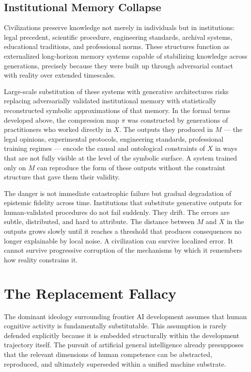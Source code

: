 \documentclass[12pt, a4paper]{article}
\theoremstyle{remark}
\begin{document}
\subsection{Institutional Memory Collapse}

Civilizations preserve knowledge not merely in individuals but in institutions: legal precedent, scientific procedure, engineering standards, archival systems, educational traditions, and professional norms. These structures function as externalized long-horizon memory systems capable of stabilizing knowledge across generations, precisely because they were built up through adversarial contact with reality over extended timescales.

Large-scale substitution of these systems with generative architectures risks replacing adversarially validated institutional memory with statistically reconstructed symbolic approximations of that memory. In the formal terms developed above, the compression map $\pi$ was constructed by generations of practitioners who worked directly in $X$. The outputs they produced in $M$ --- the legal opinions, experimental protocols, engineering standards, professional training regimes --- encode the causal and ontological constraints of $X$ in ways that are not fully visible at the level of the symbolic surface. A system trained only on $M$ can reproduce the form of these outputs without the constraint structure that gave them their validity.

The danger is not immediate catastrophic failure but gradual degradation of epistemic fidelity across time. Institutions that substitute generative outputs for human-validated procedures do not fail suddenly. They drift. The errors are subtle, distributed, and hard to attribute. The distance between $M$ and $X$ in the outputs grows slowly until it reaches a threshold that produces consequences no longer explainable by local noise. A civilization can survive localized error. It cannot survive progressive corruption of the mechanisms by which it remembers how reality constrains it.

\section{The Replacement Fallacy}

The dominant ideology surrounding frontier AI development assumes that human cognitive activity is fundamentally substitutable. This assumption is rarely defended explicitly because it is embedded structurally within the development trajectory itself. The pursuit of artificial general intelligence already presupposes that the relevant dimensions of human competence can be abstracted, reproduced, and ultimately superseded within a unified machine substrate.
\end{document}
